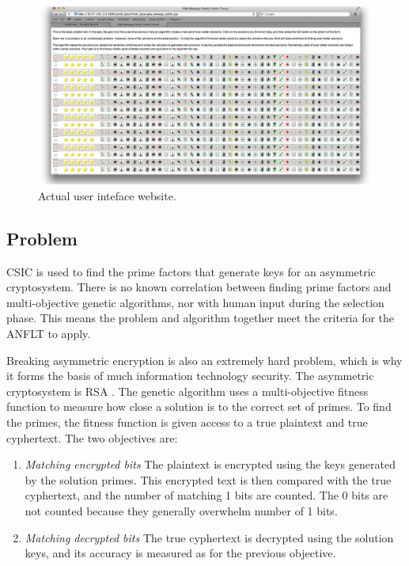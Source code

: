\begin{figure}[!t]
  \centering
  \includegraphics[width=4.5in]{HollowayWebsiteUI}
  \caption{Actual user inteface website.}
  \label{fig:website_UI}
\end{figure}

\subsection{Problem}\label{sec:problem}

CSIC is used to find the prime factors that generate keys for an asymmetric cryptosystem.  There is no known correlation between finding prime factors and multi-objective genetic algorithms, nor with human input during the selection phase.  This means the problem and algorithm together meet the criteria for the ANFLT to apply. 

Breaking asymmetric encryption is also an extremely hard problem, which is why it forms the basis of much information technology security.  The asymmetric cryptosystem is RSA \cite{cormen01:_introd_to_algor}.  The genetic algorithm uses a multi-objective fitness function to measure how close a solution is to the correct set of primes.  To find the primes, the fitness function is given access to a true plaintext and true cyphertext. The two objectives are:

\begin{enumerate}
\item \emph{Matching encrypted bits} The plaintext is encrypted using the keys generated by the solution primes.  This encrypted text is then compared with the true cyphertext, and the number of matching 1 bits are counted.  The 0 bits are not counted because they generally overwhelm number of 1 bits.

\item \emph{Matching decrypted bits} The true cyphertext is decrypted using the solution keys, and its accuracy is measured as for the previous objective.
\end{enumerate}

